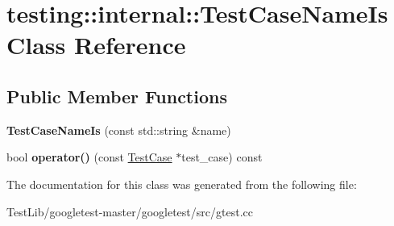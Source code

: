 \hypertarget{classtesting_1_1internal_1_1TestCaseNameIs}{}\section{testing\+:\+:internal\+:\+:Test\+Case\+Name\+Is Class Reference}
\label{classtesting_1_1internal_1_1TestCaseNameIs}
\subsection*{Public Member Functions}
\begin{DoxyCompactItemize}
\item 
\mbox{\label{classtesting_1_1internal_1_1TestCaseNameIs_a7c983707f4cfe7f36dbabc95da5113c4}} 
{\bfseries Test\+Case\+Name\+Is} (const std\+::string \&name)
\item 
\mbox{\label{classtesting_1_1internal_1_1TestCaseNameIs_aa96c4e9facbaa7043c8f0b34465d1eae}} 
bool {\bfseries operator()} (const \hyperlink{classtesting_1_1TestCase}{Test\+Case} $\ast$test\+\_\+case) const
\end{DoxyCompactItemize}


The documentation for this class was generated from the following file\+:\begin{DoxyCompactItemize}
\item 
Test\+Lib/googletest-\/master/googletest/src/gtest.\+cc\end{DoxyCompactItemize}
